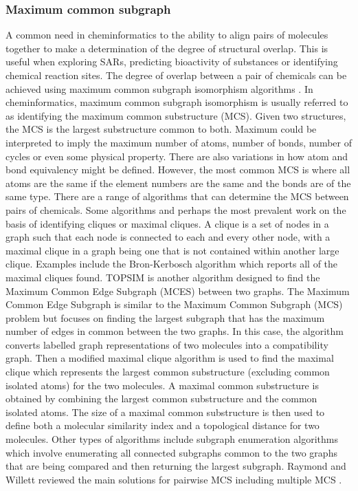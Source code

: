 \documentclass[
  super,
  preprint,
  3p]{elsarticle}
\begin{document}
\subsubsection{Maximum common subgraph}\label{maximum-common-subgraph}

A common need in cheminformatics to the ability to align pairs of
molecules together to make a determination of the degree of structural
overlap. This is useful when exploring SARs, predicting bioactivity of
substances or identifying chemical reaction sites. The degree of overlap
between a pair of chemicals can be achieved using maximum common
subgraph isomorphism algorithms
\citep{duesbury_maximum_2017, raymond_maximum_2002}. In cheminformatics,
maximum common subgraph isomorphism is usually referred to as
identifying the maximum common substructure (MCS). Given two structures,
the MCS is the largest substructure common to both. Maximum could be
interpreted to imply the maximum number of atoms, number of bonds,
number of cycles or even some physical property. There are also
variations in how atom and bond equivalency might be defined. However,
the most common MCS is where all atoms are the same if the element
numbers are the same and the bonds are of the same type. There are a
range of algorithms that can determine the MCS between pairs of
chemicals. Some algorithms and perhaps the most prevalent work on the
basis of identifying cliques or maximal cliques. A clique is a set of
nodes in a graph such that each node is connected to each and every
other node, with a maximal clique in a graph being one that is not
contained within another large clique. Examples include the
Bron-Kerbosch algorithm \citep{bron_algorithm_1973} which reports all of
the maximal cliques found. TOPSIM \citep{durand_efficient_1999} is
another algorithm designed to find the Maximum Common Edge Subgraph
(MCES) between two graphs. The Maximum Common Edge Subgraph is similar
to the Maximum Common Subgraph (MCS) problem but focuses on finding the
largest subgraph that has the maximum number of edges in common between
the two graphs. In this case, the algorithm converts labelled graph
representations of two molecules into a compatibility graph. Then a
modified maximal clique algorithm is used to find the maximal clique
which represents the largest common substructure (excluding common
isolated atoms) for the two molecules. A maximal common substructure is
obtained by combining the largest common substructure and the common
isolated atoms. The size of a maximal common substructure is then used
to define both a molecular similarity index and a topological distance
for two molecules. Other types of algorithms include subgraph
enumeration algorithms which involve enumerating all connected subgraphs
common to the two graphs that are being compared and then returning the
largest subgraph. Raymond and Willett \citep{raymond_maximum_2002}
reviewed the main solutions for pairwise MCS including multiple MCS
\citep{dalke_fmcs_2013}.
\end{document}
